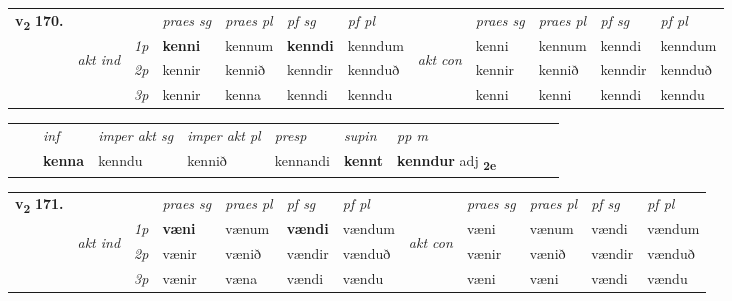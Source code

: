 \begin{tabular}{llllllllllll} \toprule
\multirow{4}{*}{{{\textbf{v{\textsubscript{2}}} \Large{\textbf{170.}}}}}  & &   &  \textit{praes sg}  & \textit{praes pl}  &\textit{ pf sg} & \textit{pf pl} &  &  \textit{praes sg}  & \textit{praes pl}  & \textit{pf sg} & \textit{pf pl } \\*
	\cmidrule{4-7} \cmidrule{9-12}
 & \multirow{3}{*}{\begin{turn}{90}\textit{akt ind}\end{turn}} & {\textit{1p}} & \textbf{kenni} & kennum    & \textbf{kenndi} & kenndum & \multirow{3}{*}{\begin{turn}{90}\textit{akt con}\end{turn}} &kenni & kennum & kenndi & kenndum\\*
& &  {\textit{2p}} &  kennir  & kennið   & kenndir & kennduð & & kennir & kennið & kenndir & kennduð \\*
& &  {\textit{3p}} & kennir & kenna   & kenndi & kenndu & & kenni & kenni& kenndi & kenndu  \\*
\cmidrule{4-7} \cmidrule{9-12}
\end{tabular}


\begin{tabular}{llllllllllll}
 & & \textit{inf} & \textit{imper akt sg} & \textit{imper akt pl}   & \textit{presp} & \textit{supin}  & \textit{pp m}     \\*
  & & \textbf{kenna} & kenndu  & kennið   & kennandi &  \textbf{kennt}  & \textbf{kenndur} adj \textbf{\textsubscript{2e}} \\*
\cmidrule{1-12}
\end{tabular}


\begin{tabular}{llllllllllll} \toprule
\multirow{4}{*}{{{\textbf{v{\textsubscript{2}}} \Large{\textbf{171.}}}}}  & &   &  \textit{praes sg}  & \textit{praes pl}  &\textit{ pf sg} & \textit{pf pl} &  &  \textit{praes sg}  & \textit{praes pl}  & \textit{pf sg} & \textit{pf pl } \\*
	\cmidrule{4-7} \cmidrule{9-12}
 & \multirow{3}{*}{\begin{turn}{90}\textit{akt ind}\end{turn}} & {\textit{1p}} & \textbf{væni} & vænum    & \textbf{vændi} & vændum & \multirow{3}{*}{\begin{turn}{90}\textit{akt con}\end{turn}} &væni & vænum & vændi & vændum\\*
& &  {\textit{2p}} &  vænir  & vænið   & vændir & vænduð & & vænir & vænið & vændir & vænduð \\*
& &  {\textit{3p}} & vænir & væna   & vændi & vændu & & væni & væni& vændi & vændu  \\*
\cmidrule{4-7} \cmidrule{9-12}
\end{tabular}


